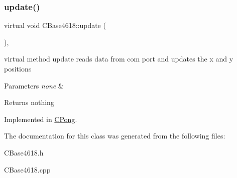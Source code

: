 \subsubsection{\texorpdfstring{update()}{update()}}
{\footnotesize\ttfamily virtual void C\+Base4618\+::update (\begin{DoxyParamCaption}{ }\end{DoxyParamCaption})\hspace{0.3cm}{\ttfamily [protected]}, {}}



virtual method update reads data from com port and updates the x and y positions 


\begin{DoxyParams}{Parameters}
{\em none} & \\
\hline
\end{DoxyParams}
\begin{DoxyReturn}{Returns}
nothing 
\end{DoxyReturn}


Implemented in \hyperlink{class_c_pong_abdf0d44329b40d14863ba134b031435a}{C\+Pong}.



The documentation for this class was generated from the following files\+:\begin{DoxyCompactItemize}
\item 
C\+Base4618.\+h\item 
C\+Base4618.\+cpp\end{DoxyCompactItemize}
